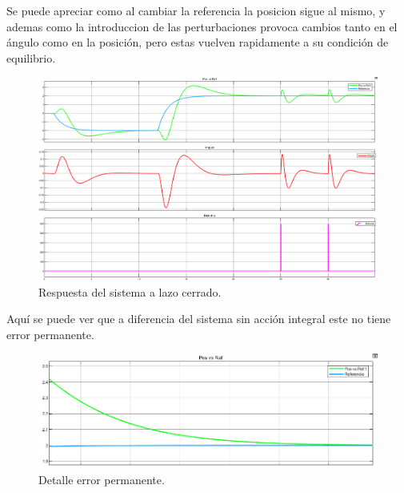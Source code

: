 Se puede apreciar como al cambiar la referencia la posicion sigue al mismo, y ademas como la introduccion de las perturbaciones provoca cambios tanto en el ángulo como en la posición, pero estas vuelven rapidamente a su condición de equilibrio. 
\begin{figure}[H]
	\centering
	\includegraphics[width=1\linewidth]{Imagenes/Control_por_realimentacion_integral/general.png}
	\caption{Respuesta del sistema a lazo cerrado.}
	\label{realmentacion}
\end{figure}

Aquí se puede ver que a diferencia del sistema sin acci\'on integral este no tiene error permanente.
\begin{figure}[H]
	\centering
	\includegraphics[width=1\linewidth]{Imagenes/Control_por_realimentacion_integral/detalle_error_permanente.png}
	\caption{Detalle error permanente.}
	\label{realmentacion_error}
\end{figure}

